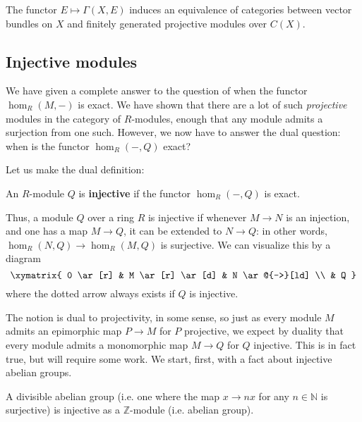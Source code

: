 \begin{theorem}
The functor $E \mapsto \Gamma(X, E)$ induces an equivalence of categories
between vector bundles on $X$ and finitely generated projective modules over
$C(X)$.
\end{theorem} 



\subsection{Injective modules}
\label{ssecinj}

We have given a complete answer to the question of when the functor
$\hom_R(M,-)$ is exact. We have shown that there are a lot of such
\emph{projective} modules in the category of $R$-modules, enough that any
module admits a surjection from one such.
However, we now have to answer the dual question: when is the functor
$\hom_R(-, Q)$ exact?

Let us make the dual definition:

\begin{definition}
An $R$-module $Q$ is \textbf{injective} if the functor $\hom_R(-,Q)$ is exact.
\end{definition}


Thus, a module $Q$ over a ring $R$ is injective if
whenever $M \to N$ is an injection, and one has a map $M \to Q$, it can be
extended to $N \to Q$: in other words, $\hom_R(N,Q ) \to \hom_R(M,Q)$ is
surjective.
We can visualize this by a diagram
\[ \xymatrix{
0 \ar[r] &  M \ar[r] \ar[d]  &  N \ar@{-->}[ld] \\
& Q
}\]
where the dotted arrow always exists if $Q$ is injective.

The notion is dual to projectivity, in some sense, so just as every module $M$
admits an epimorphic map $P \to M$ for $P$ projective, we expect by duality
that every module admits a monomorphic map $M \to Q$ for $Q$ injective.
This is in fact true, but will require some work.
We start, first, with a fact about injective abelian groups.

\begin{theorem}\label{divisibleimpliesinj}
A divisible abelian group (i.e. one where the map $x
\to nx$ for any $n \in \mathbb{N}$ is surjective) is injective as  a
$\mathbb{Z}$-module (i.e. abelian group).
\end{theorem}

